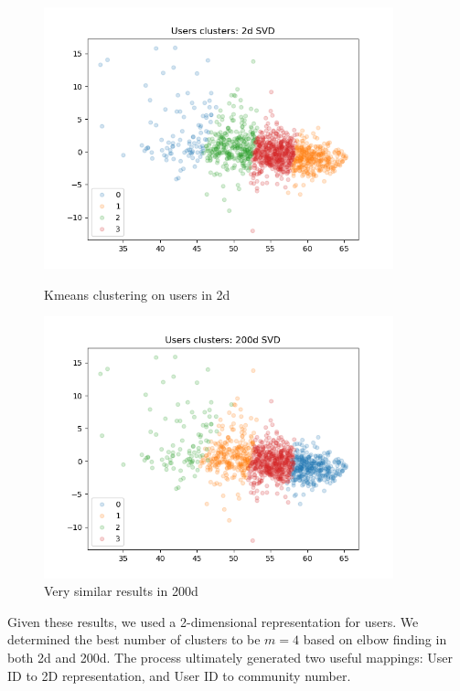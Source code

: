 \documentclass[11pt]{article}
\begin{document}
\begin{figure}[h!]
    \centering
    \begin{minipage}{0.45\textwidth}
        \centering
        \includegraphics[width=0.9\textwidth]{user_clusters_2d} %
        \caption{Kmeans clustering on users in 2d}
    \end{minipage}\hfill
    \begin{minipage}{0.45\textwidth}
        \centering
        \includegraphics[width=0.9\textwidth]{user_clusters_200d} %
        \caption{Very similar results in 200d}
    \end{minipage}
\end{figure}\newline

Given these results, we used a 2-dimensional representation for users. We determined the best number of clusters to be $m = 4$ based on elbow finding in both 2d and 200d. The process ultimately generated two useful mappings: User ID to 2D representation, and User ID to community number.
\end{document}
